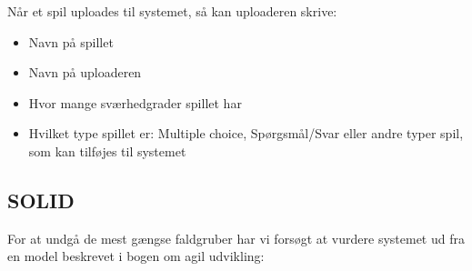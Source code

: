 \documentclass[12pt, a4paper]{article}
\begin{document}
Når et spil uploades til systemet, så kan uploaderen skrive: \\
\begin{itemize}
  \item Navn på spillet
  \item Navn på uploaderen
  \item Hvor mange sværhedgrader spillet har
  \item Hvilket type spillet er: Multiple choice, Spørgsmål/Svar eller andre typer spil, som kan tilføjes til systemet
\end{itemize}

\subsection{SOLID}
For at undgå de mest gængse faldgruber har vi forsøgt at vurdere systemet ud fra en model beskrevet i bogen om agil udvikling:
\end{document}
